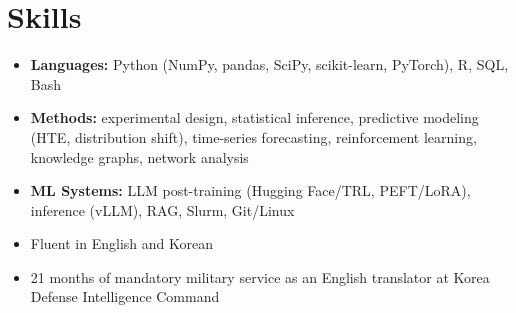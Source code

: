 \documentclass[11pt,a4paper,roman]{moderncv}        %
\begin{document}

\section{Skills}

\begin{minipage}{\maincolumnwidth}%
	\small{
    	\begin{itemize}
        \item \textbf{Languages:} Python (NumPy, pandas, SciPy, scikit-learn, PyTorch), R, SQL, Bash
        \item \textbf{Methods:} experimental design, statistical inference, predictive modeling (HTE, distribution shift), time-series forecasting, reinforcement learning, knowledge graphs, network analysis
        \item \textbf{ML Systems:} LLM post-training (Hugging Face/TRL, PEFT/LoRA), inference (vLLM), RAG, Slurm, Git/Linux
		    \item Fluent in English and Korean
            \setlength{\itemindent}{1em}
            \item[--] 21 months of mandatory military service as an English translator at Korea Defense Intelligence Command
		\end{itemize}}%
\end{minipage}%
\end{document}
